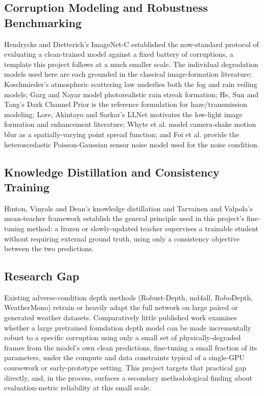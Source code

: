 \documentclass[conference]{IEEEtran}
\begin{document}
\subsection{Corruption Modeling and Robustness Benchmarking}

Hendrycks and Dietterich's ImageNet-C \cite{ref17} established the now-standard protocol of evaluating a clean-trained model against a fixed battery of corruptions, a template this project follows at a much smaller scale. The individual degradation models used here are each grounded in the classical image-formation literature: Koschmieder's atmospheric scattering law \cite{ref18} underlies both the fog and rain veiling models; Garg and Nayar \cite{ref19} model photorealistic rain streak formation; He, Sun and Tang's Dark Channel Prior \cite{ref20} is the reference formulation for haze/transmission modeling; Lore, Akintayo and Sarkar's LLNet \cite{ref21} motivates the low-light image formation and enhancement literature; Whyte et al. \cite{ref22} model camera-shake motion blur as a spatially-varying point spread function; and Foi et al. \cite{ref23} provide the heteroscedastic Poisson-Gaussian sensor noise model used for the noise condition.

\subsection{Knowledge Distillation and Consistency Training}

Hinton, Vinyals and Dean's knowledge distillation \cite{ref24} and Tarvainen and Valpola's mean-teacher framework \cite{ref25} establish the general principle used in this project's fine-tuning method: a frozen or slowly-updated teacher supervises a trainable student without requiring external ground truth, using only a consistency objective between the two predictions.

\subsection{Research Gap}

Existing adverse-condition depth methods (Robust-Depth, md4all, RoboDepth, WeatherMono) retrain or heavily adapt the full network on large paired or generated weather datasets. Comparatively little published work examines whether a large pretrained foundation depth model can be made incrementally robust to a specific corruption using only a small set of physically-degraded frames from the model's own clean predictions, fine-tuning a small fraction of its parameters, under the compute and data constraints typical of a single-GPU coursework or early-prototype setting. This project targets that practical gap directly, and, in the process, surfaces a secondary methodological finding about evaluation-metric reliability at this small scale.
\end{document}
